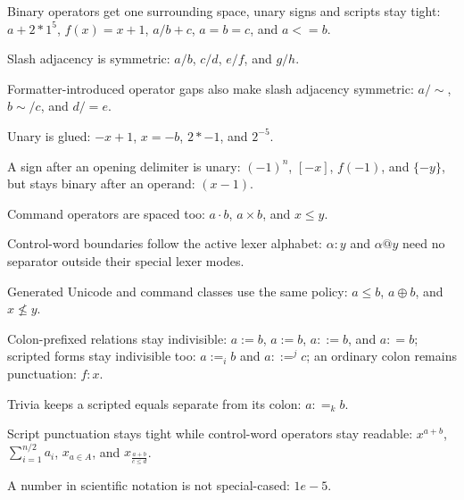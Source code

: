 Binary operators get one surrounding space, unary signs and scripts stay tight:
$a + 2 * 1^5$, $f(x) = x + 1$, $a/b + c$, $a = b = c$, and $a <= b$.

Slash adjacency is symmetric: $a/b$, $c / d$, $e / f$, and $g / h$.

Formatter-introduced operator gaps also make slash adjacency symmetric:
$a / \sim$, $b \sim / c$, and $d / = e$.

Unary is glued: $-x + 1$, $x = -b$, $2 * -1$, and $2^{-5}$.

A sign after an opening delimiter is unary: $(-1)^n$, $[-x]$, $f(-1)$, and
$\{-y\}$, but stays binary after an operand: $(x - 1)$.

Command operators are spaced too: $a \cdot b$, $a \times b$, and $x \leq y$.

Control-word boundaries follow the active lexer alphabet: $\alpha:y$ and
$\alpha@y$ need no separator outside their special lexer modes.

Generated Unicode and command classes use the same policy: $a ≤ b$, $a ⊕ b$, and
$x \nleq y$.

Colon-prefixed relations stay indivisible: $a := b$, $a := b$, $a ::= b$, and
$a : = b$; scripted forms stay indivisible too: $a :=_i b$ and $a ::=^j c$; an
ordinary colon remains punctuation: $f:x$.

Trivia keeps a scripted equals separate from its colon: $a : =_k b$.

Script punctuation stays tight while control-word operators stay readable: $x^{a+b}$,
$\sum_{i=1}^{n / 2} a_i$, $x_{a \in A}$, and
$x_{\frac{a+b}{c \leq d}}$.

A number in scientific notation is not special-cased: $1e - 5$.
